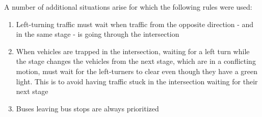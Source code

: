 A number of additional situations arise for which the following rules were used:

\begin{enumerate}
\item Left-turning traffic must wait when traffic from the opposite direction - and in the same stage - is going through the intersection
\item When vehicles are trapped in the intersection, waiting for a left turn while the stage changes the vehicles from the next stage, which are in a conflicting motion, must wait for the left-turners to clear even though they have a green light. This is to avoid having traffic stuck in the intersection waiting for their next stage
\item Buses leaving bus stops are always prioritized
\end{enumerate}
